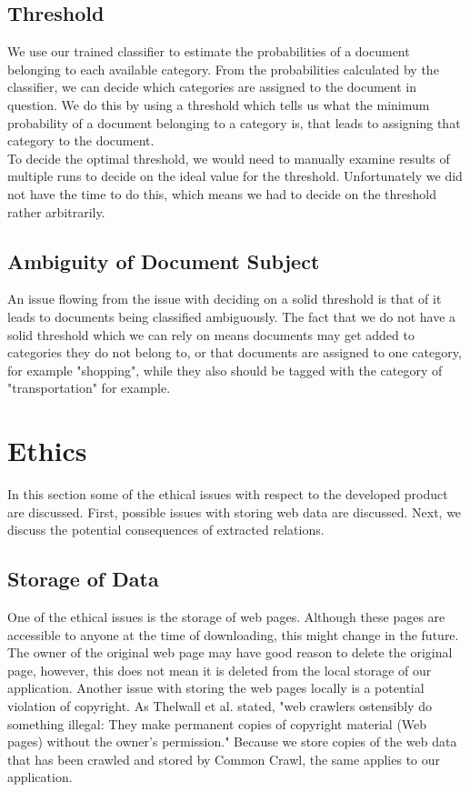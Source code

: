 \subsection{Threshold}
We use our trained classifier to estimate the probabilities of a document belonging to each available category. From the probabilities calculated by the classifier, we can decide which categories are assigned to the document in question. We do this by using a threshold which tells us what the minimum probability of a document belonging to a category is, that leads to assigning that category to the document.\\
To decide the optimal threshold, we would need to manually examine results of multiple runs to decide on the ideal value for the threshold. Unfortunately we did not have the time to do this, which means we had to decide on the threshold rather arbitrarily.

\subsection{Ambiguity of Document Subject}
An issue flowing from the issue with deciding on a solid threshold is that of it leads to documents being classified ambiguously. The fact that we do not have a solid threshold which we can rely on means documents may get added to categories they do not belong to, or that documents are assigned to one category, for example "shopping", while they also should be tagged with the category of "transportation" for example.

\section{Ethics}
In this section some of the ethical issues with respect to the developed product are discussed. First, possible issues with storing web data are discussed. Next, we discuss the potential consequences of extracted relations.

\subsection{Storage of Data}
One of the ethical issues is the storage of web pages. Although these pages are accessible to anyone at the time of downloading, this might change in the future. The owner of the original web page may have good reason to delete the original page, however, this does not mean it is deleted from the local storage of our application. Another issue with storing the web pages locally is a potential violation of copyright. As Thelwall et al. stated, "web crawlers ostensibly do something illegal: They make permanent copies of copyright material (Web pages) without the owner’s permission."\cite{thelwall2006web} Because we store copies of the web data that has been crawled and stored by Common Crawl, the same applies to our application.


